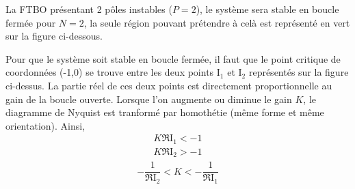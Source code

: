 
La FTBO présentant 2 pôles instables ($P=2$), le système sera stable 
en boucle fermée pour $N=2$, la seule région pouvant prétendre à celà 
est représenté en vert sur la figure ci-dessous. 

\begin{center}
    
\end{center}

\begin{center}
    
\end{center}

Pour que le système soit stable en boucle fermée, il faut que le point 
critique de coordonnées (-1,0) se trouve entre les deux points I$_1$ et 
I$_2$ représentés sur la figure ci-dessus.
La partie réel de ces deux points est directement proportionnelle au 
gain de la boucle ouverte. Lorsque l'on augmente ou diminue le gain $K$, 
le diagramme de Nyquist est tranformé par homothétie (même forme et 
même orientation).
Ainsi, 
\begin{align*}
    K\Re{\mathrm{I}_1} < -1 \\
    K\Re{\mathrm{I}_2} > -1 
\end{align*}
\begin{align*}
    -\dfrac{1}{\Re{\mathrm{I}_2}}<K<-\dfrac{1}{\Re{\mathrm{I}_1}}
\end{align*}

